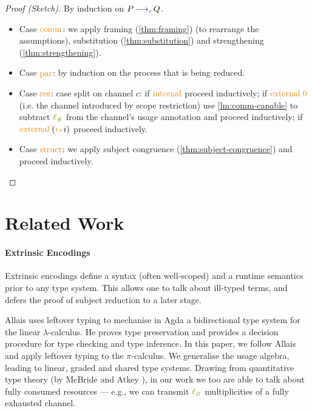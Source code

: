 \documentclass[sigplan,10pt,anonymous,review]{acmart}
\theoremstyle{definition}
\newcommand{\lambdacalc}{$\lambda$-calculus}
\newcommand{\picalc}{$\pi$-calculus}
\newcommand{\type}[1]{\textcolor{blue}{\operatorname{#1}}}
\newcommand{\constr}[1]{\textcolor{orange}{\operatorname{#1}}}
\newcommand{\func}[1]{\textcolor{olive}{\operatorname{#1}}}
\newcommand{\suc}{\constr{\scriptstyle 1+}}
\newcommand{\lz}{\func{\ell_{\varnothing}}}
\newcommand{\lio}{\func{\ell_{\#}}}
\newcommand{\reduce}[1]{\, \type{\longrightarrow}_{#1} \,}
\begin{document}
\begin{proof}[Proof (Sketch)]
  By induction on $P \reduce{c} Q$.
  \hfill{}\\
  \begin{itemize}
    \item
    Case $\constr{comm}$: we apply framing (\autoref{thm:framing}) (to rearrange the assumptions), substitution (\autoref{thm:substitution}) and strengthening (\autoref{thm:strengthening}).
  
    \item
    Case $\constr{par}$: by induction on the process that is being reduced.

    \item
    Case $\constr{res}$: case split on channel $c$:
    if $\constr{internal}$ proceed inductively;
    if $\constr{external}\; \constr{0}$ (i.e. the channel introduced by scope restriction) use \autoref{lm:comm-capable} to subtract $\lio$ from the channel's usage annotation and proceed inductively;
    if $\constr{external}\; (\suc i)$ proceed inductively.

    \item
    Case $\constr{struct}$: we apply subject congruence (\autoref{thm:subject-congruence}) and proceed inductively. \qedhere
  \end{itemize}
\end{proof}

\section{Related Work}

\paragraph{Extrinsic Encodings}

Extrinsic encodings define a syntax (often well-scoped) and a runtime semantics prior to any type system.
This allows one to talk about ill-typed terms, and defers the proof of subject reduction to a later stage.

Allais \cite{Allais2018a} uses leftover typing to mechanise in Agda a bidirectional type system for the linear \lambdacalc{}.
He proves type preservation and provides a decision procedure for type checking and type inference.
In this paper, we follow Allais \cite{Allais2018a} and apply leftover typing to the \picalc{}.
We generalise the usage algebra, leading to linear, graded and shared type systems.
Drawing from quantitative type theory (by McBride and Atkey \cite{McBride2016, Atkey2018}), in our work we too are able to talk about fully consumed resources --- e.g., we can transmit $\lz$ multiplicities of a fully exhausted channel.
\end{document}
